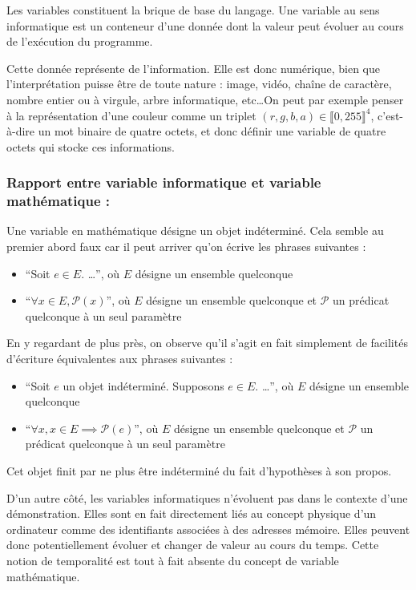 \documentclass[../../../main.tex]{subfiles}
\begin{document}
Les variables constituent la brique de base du langage. Une variable au sens informatique est un conteneur d'une donnée dont la valeur peut évoluer au cours de l'exécution du programme.
 
Cette donnée représente de l'information. Elle est donc numérique, bien que l'interprétation puisse être de toute nature : image, vidéo, chaîne de caractère, nombre entier ou à virgule, arbre informatique, etc\dots On peut par exemple penser à la représentation d'une couleur comme un triplet $(r, g, b, a)\in{\llbracket 0, 255\rrbracket^{4}}$, c'est-à-dire un mot binaire de quatre octets, et donc définir une variable de quatre octets qui stocke ces informations.
 
\subsubsection{Rapport entre variable informatique et variable mathématique :}
 
Une variable en mathématique désigne un objet indéterminé. Cela semble au premier abord faux car il peut arriver qu'on écrive les phrases suivantes :
\begin{itemize}
	\item ``Soit $e\in{E}$. \dots'', où $E$ désigne un ensemble quelconque
	\item ``$\forall{x\in{E}}, \mathcal{P}(x)$'', où $E$ désigne un ensemble quelconque et $\mathcal{P}$ un prédicat quelconque à un seul paramètre
\end{itemize}
En y regardant de plus près, on observe qu'il s'agit en fait simplement de facilités d'écriture équivalentes aux phrases suivantes :
\begin{itemize}
	\item ``Soit $e$ un objet indéterminé. Supposons $e\in{E}$. \dots'', où $E$ désigne un ensemble quelconque
	\item ``$\forall{x}, x\in{E}\implies{\mathcal{P}(e)}$'', où $E$ désigne un ensemble quelconque et $\mathcal{P}$ un prédicat quelconque à un seul paramètre
\end{itemize}
Cet objet finit par ne plus être indéterminé du fait d'hypothèses à son propos.
 
D'un autre côté, les variables informatiques n'évoluent pas dans le contexte d'une démonstration. Elles sont en fait directement liés au concept physique d'un ordinateur comme des identifiants associées à des adresses mémoire. Elles peuvent donc potentiellement évoluer et changer de valeur au cours du temps. Cette notion de temporalité est tout à fait absente du concept de variable mathématique.
 
\end{document}
